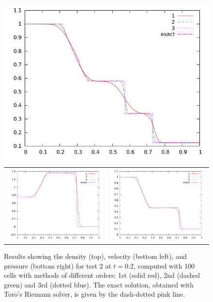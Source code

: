 \documentclass[10pt]{article}
\begin{document}
\begin{figure}[h]
  \begin{center}
     \includegraphics[width=.95\textwidth]{den_T2.png}
	 \begin{tabular}{cc}
      \includegraphics[width=.475\textwidth]{vel_T2.png} &
	  \includegraphics[width=.475\textwidth]{prs_T2.png}
	 \end{tabular}	
  \end{center}
  \caption{Results showing the density (top), velocity (bottom left), and pressure (bottom right) for test 2 at $t=0.2$, computed with 100 cells with methods of different orders: 1st (solid red), 2nd (dashed green) and 3rd (dotted blue). The exact solution, obtained with Toro's Riemann solver, is given by the dash-dotted pink line.}
  \label{fig:den_T2}
\end{figure}
\end{document}
